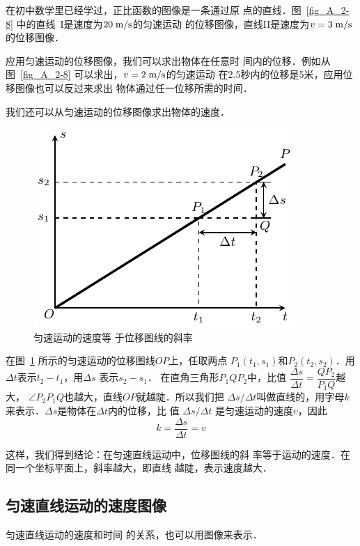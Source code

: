 在初中数学里已经学过，正比函数的图像是一条通过原
点的直线．图~\ref{fig_A_2-8} 中的直线~I是速度为$20 \;\text{m}/\text{s}$的匀速运动
的位移图像，直线II是速度为$v=3 \;\text{m}/\text{s}$的位移图像．


    应用匀速运动的位移图像，我们可以求出物体在任意时
间内的位移．例如从图~\ref{fig_A_2-8} 可以求出，$v=2\;\text{m}/\text{s}$的匀速运动
在2.5秒内的位移是5米，应用位移图像也可以反过来求出
物体通过任一位移所需的时间．


我们还可以从匀速运动的位移图像求出物体的速度．

\begin{figure}[htp]
    \centering
    \includegraphics{fig/A/2-9.pdf}
    \caption{匀速运动的速度等
    于位移图线的斜率}\label{fig_A_2-9}
\end{figure}

    在图~\ref{fig_A_2-9} 所示的匀速运动的位移图线$OP$上，任取两点
    $P_1(t_1,s_1)$和$P_2(t_2,s_2)$．用$\Delta t$表示$t_2-t_1$，用$\Delta s$
    表示$s_2-s_1$．
    在直角三角形$P_1QP_2$中，比值
    $\dfrac{\Delta s}{\Delta t}=\dfrac{QP_2}{P_1Q}$越大，
$\angle P_2P_1Q$也越大，直线$OP$就越陡．所以我们把
$\Delta s/\Delta t$叫做直线的，用字母$k$来表示．$\Delta s$是物体在$\Delta t$内的位移，比
值 $\Delta s/\Delta t$
是匀速运动的速度$v$，因此
\[k=\frac{\Delta s}{\Delta t}=v\]

这样，我们得到结论：在匀速直线运动中，位移图线的斜
率等于运动的速度．在同一个坐标平面上，斜率越大，即直线
越陡，表示速度越大．

 
\subsection{匀速直线运动的速度图像} 

匀速直线运动的速度和时间
的关系，也可以用图像来表示．

